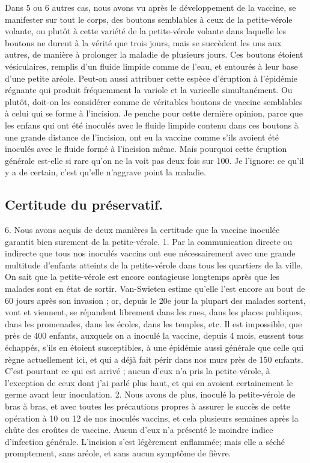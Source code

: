 Dans 5 ou 6 autres cas, nous avons vu après le développement de la vaccine, se manifester\setcounter{page}{86} sur tout le corps, des boutons semblables à ceux de la petite-vérole volante, ou plutôt à cette variété de la petite-vérole volante dans laquelle les boutons ne durent à la vérité que trois jours, mais se succèdent les uns aux autres, de manière à prolonger la maladie de plusieurs jours. Ces boutons étoient vésiculaires, remplis d'un fluide limpide comme de l'eau, et entourés à leur base d'une petite aréole. Peut-on aussi attribuer cette espèce d'éruption à l'épidémie régnante qui produit fréquemment la variole et la varicelle simultanément. Ou plutôt, doit-on les considérer comme de véritables boutons de vaccine semblables à celui qui se forme à l'incision. Je penche pour cette dernière opinion, parce que les enfans qui ont été inoculés avec le fluide limpide contenu dans ces boutons à une grande distance de l'incision, ont eu la vaccine comme s'ils avoient été inoculés avec le fluide formé à l'incision même. Mais pourquoi cette éruption générale est-elle si rare qu'on ne la voit pas deux fois sur 100. Je l'ignore: ce qu'il y a de certain, c'est qu'elle n'aggrave point la maladie.
\subsection{Certitude du préservatif.}
6. Nous avons acquis de deux manières\setcounter{page}{87} la certitude que la vaccine inoculée garantit bien surement de la petite-vérole.
1. Par la communication directe ou indirecte que tous nos inoculés vaccins ont eue nécessairement avec une grande multitude d'enfants atteints de la petite-vérole dans tous les quartiers de la ville. On sait que la petite-vérole est encore contagieuse longtemps après que les malades sont en état de sortir. Van-Swieten estime qu'elle l'est encore au bout de 60 jours après son invasion ; or, depuis le 20e jour la plupart des malades sortent, vont et viennent, se répandent librement dans les rues, dans les places publiques, dans les promenades, dans les écoles, dans les temples, etc. Il est impossible, que près de 400 enfants, auxquels on a inoculé la vaccine, depuis 4 mois, eussent tous échappés, s'ils en étoient susceptibles, à une épidémie aussi générale que celle qui règne actuellement ici, et qui a déjà fait périr dans nos murs près de 150 enfants. C'est pourtant ce qui est arrivé ; aucun d'eux n'a pris la petite-vérole, à l'exception de ceux dont j'ai parlé plus haut, et qui en avoient certainement le germe avant leur inoculation.
2. Nous avons de plus, inoculé la petite-vérole de bras à bras, et avec toutes les précautions propres à assurer le succès de\setcounter{page}{88} cette opération à 10 ou 12 de nos inoculés vaccins, et cela plusieurs semaines après la chûte des croûtes de vaccine. Aucun d'eux n'a présenté le moindre indice d'infection générale. L'incision s'est légèrement enflammée; mais elle a séché promptement, sans aréole, et sans aucun symptôme de fièvre.
